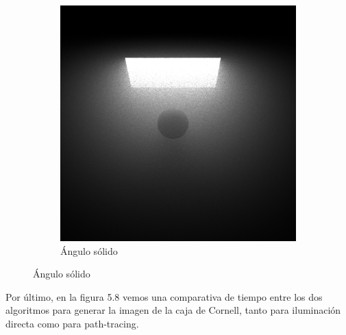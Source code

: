 \begin{figure}[h!]
{\begin{minipage}{\dimexpr .5\textwidth-\fboxsep-2\fboxrule}
            \begin{subfigure}{\textwidth}
            \centering
            \includegraphics[width=\textwidth]{imagenes/spherep2}
            \caption{Ángulo sólido}
            \end{subfigure}  
    \end{minipage}}
\end{figure}

\newpage
Por último, en la figura 5.8 vemos una comparativa de tiempo entre los dos algoritmos para generar la imagen de la caja de Cornell, tanto para iluminación directa como para path-tracing.

